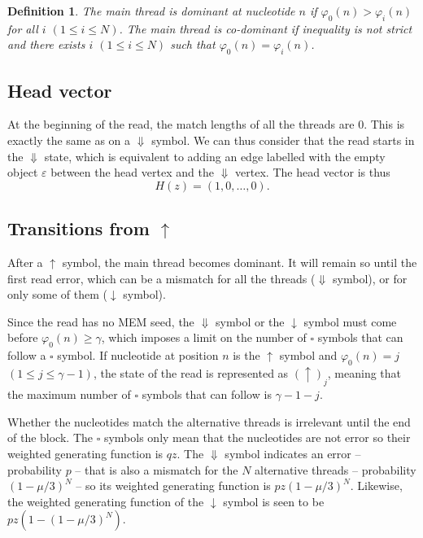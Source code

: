 \documentclass{article}
\newtheorem{definition}{Definition}
\begin{document}
\begin{definition}
The main thread is dominant at nucleotide $n$ if $\varphi_0(n) >
\varphi_i(n)$ for all $i$ $(1 \leq i \leq N)$. The main thread is
co-dominant if inequality is not strict and there exists $i$ $(1\leq i
\leq N)$ such that $\varphi_0(n) = \varphi_i(n)$.
\end{definition}

\subsection{Head vector}

At the beginning of the read, the match lengths of all the threads are
$0$. This is exactly the same as on a $\Downarrow$ symbol. We can thus
consider that the read starts in the $\Downarrow$ state, which is
equivalent to adding an edge labelled with the empty object $\varepsilon$
between the head vertex and the $\Downarrow$ vertex. The head vector is
thus
\begin{equation}
H(z) = (1,0, \ldots, 0).
\end{equation}


\subsection{Transitions from $\uparrow$}
\label{sec:trans_from_up}

After a $\uparrow$ symbol, the main thread becomes dominant. It will
remain so until the first read error, which can be a mismatch for all the
threads ($\Downarrow$ symbol), or for only some of them ($\downarrow$
symbol).

Since the read has no MEM seed, the $\Downarrow$ symbol or the
$\downarrow$ symbol must come before $\varphi_0(n) \geq \gamma$, which
imposes a limit on the number of $\square$ symbols that can follow a
$\square$ symbol. If nucleotide at position $n$ is the $\uparrow$ symbol
and $\varphi_0(n) = j$ $(1 \leq j \leq \gamma-1)$, the state of the read
is represented as $(\uparrow)_j$, meaning that the maximum number of
$\square$ symbols that can follow is $\gamma-1-j$.

Whether the nucleotides match the alternative threads is irrelevant until
the end of the block. The $\square$ symbols only mean that the nucleotides
are not error so their weighted generating function is $qz$. The
$\Downarrow$ symbol indicates an error -- probability $p$ -- that is also
a mismatch for the $N$ alternative threads -- probability $(1-\mu/3)^N$ --
so its weighted generating function is $pz(1-\mu/3)^N$. Likewise, the
weighted generating function of the $\downarrow$ symbol is seen to be
$pz(1-(1-\mu/3)^N)$.
\end{document}
